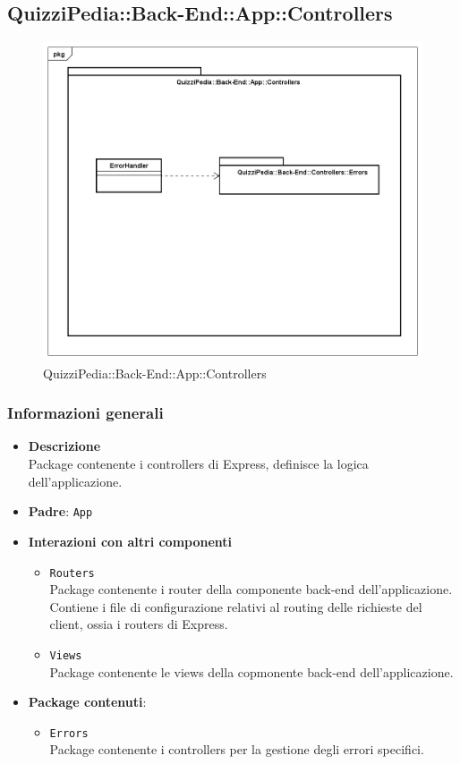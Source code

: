\subsection{QuizziPedia::Back-End::App::Controllers}
\label{QuizziPedia::Back-End::App::Controllers}
\begin{figure}
	\centering
	\includegraphics[scale=0.45]{UML/Package/QuizziPedia_Back-End_App_Controllers.png}
	\caption{QuizziPedia::Back-End::App::Controllers}
\end{figure}
\subsubsection{Informazioni generali}
	\begin{itemize}
		\item \textbf{Descrizione} \\
		Package contenente i controllers di Express, definisce la logica dell'applicazione.
		\item \textbf{Padre}: \texttt{App}
		\item \textbf{Interazioni con altri componenti}
			\begin{itemize}
				\item \texttt{Routers} \\
				Package contenente i router della componente back-end dell'applicazione. Contiene i file di configurazione relativi al routing delle richieste del client, ossia i routers di Express.
				\item \texttt{Views} \\
				Package contenente le views della copmonente back-end dell'applicazione.
			\end{itemize}
		\item \textbf{Package contenuti}:
			\begin{itemize}
				\item \texttt{Errors} \\
				Package contenente i controllers per la gestione degli errori specifici.
			\end{itemize}
	\end{itemize}
